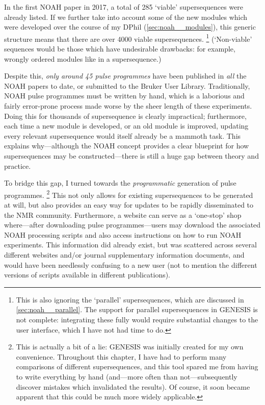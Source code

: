 In the first NOAH paper in 2017\autocite{Kupce2017ACIE}, a total of 285 `viable' supersequences were already listed.
If we further take into account some of the new modules which were developed over the course of my DPhil (\cref{sec:noah__modules}), this generic structure means that there are over 4000 viable supersequences.%
\footnote{This is also ignoring the `parallel' supersequences, which are discussed in \cref{sec:noah__parallel}. The support for parallel supersequences in GENESIS is not complete: integrating these fully would require substantial changes to the user interface, which I have not had time to do.}
(`Non-viable' sequences would be those which have undesirable drawbacks: for example, wrongly ordered modules like in a  supersequence.)

Despite this, \textit{only around 45 pulse programmes} have been published in \textit{all} the NOAH papers to date, or submitted to the Bruker User Library.
Traditionally, NOAH pulse programmes must be written by hand, which is a laborious and fairly error-prone process made worse by the sheer length of these experiments.
Doing this for thousands of supersequence is clearly impractical; furthermore, each time a new module is developed, or an old module is improved, updating every relevant supersequence would itself already be a mammoth task.
This explains why---although the NOAH concept provides a clear blueprint for how supersequences may be constructed---there is still a huge gap between theory and practice.

To bridge this gap, I turned towards the \textit{programmatic} generation of pulse programmes.%
\footnote{This is actually a bit of a lie: GENESIS was initially created for my own convenience. Throughout this chapter, I have had to perform many comparisons of different supersequences, and this tool spared me from having to write everything by hand (and---more often than not---subsequently discover mistakes which invalidated the results). Of course, it soon became apparent that this could be much more widely applicable.}
This not only allows for existing supersequences to be generated at will, but also provides an easy way for updates to be rapidly disseminated to the NMR community.
Furthermore, a website can serve as a `one-stop' shop where---after downloading pulse programmes---users may download the associated NOAH processing scripts and also access instructions on how to run NOAH experiments.
This information did already exist, but was scattered across several different websites and/or journal supplementary information documents, and would have been needlessly confusing to a new user (not to mention the different versions of scripts available in different publications).


